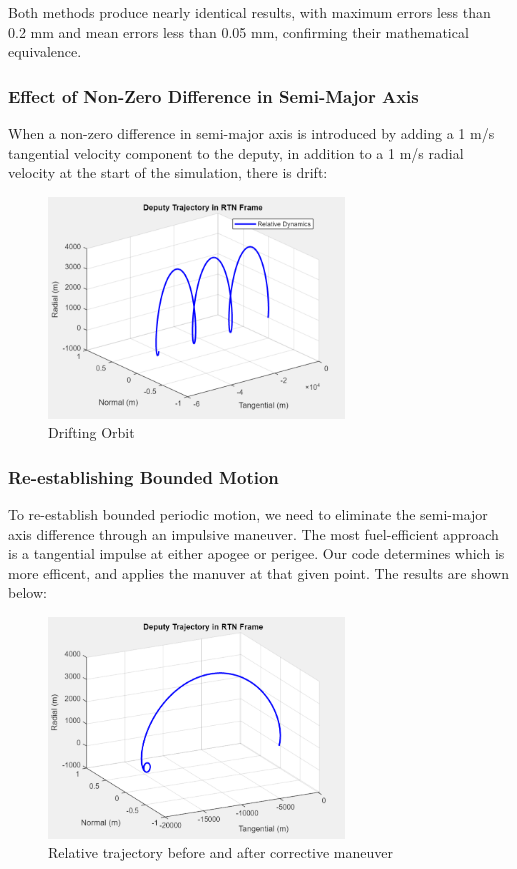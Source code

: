 Both methods produce nearly identical results, with maximum errors less than 0.2 mm and mean errors less than 0.05 mm, confirming their mathematical equivalence.

\subsubsection{Effect of Non-Zero Difference in Semi-Major Axis}

When a non-zero difference in semi-major axis is introduced by adding a 1 m/s tangential velocity component to the deputy, in addition to a 1 m/s radial velocity at the start of the simulation, there is drift:

\begin{figure}[H]
    \centering
    \includegraphics[width=0.7\textwidth]{PS2/Figures/Screenshot 2025-04-16 232749.png}
    \caption{Drifting Orbit}
    \label{fig:drift_comparison}
\end{figure}


\subsubsection{Re-establishing Bounded Motion}

To re-establish bounded periodic motion, we need to eliminate the semi-major axis difference through an impulsive maneuver. The most fuel-efficient approach is a tangential impulse at either apogee or perigee. Our code determines which is more efficent, and applies the manuver at that given point. The results are shown below:

\begin{figure}[H]
    \centering
    \includegraphics[width=0.7\textwidth]{PS2/Figures/Screenshot 2025-04-16 231907.png}
    \caption{Relative trajectory before and after corrective maneuver}
    \label{fig:maneuver_comparison1}
\end{figure}

